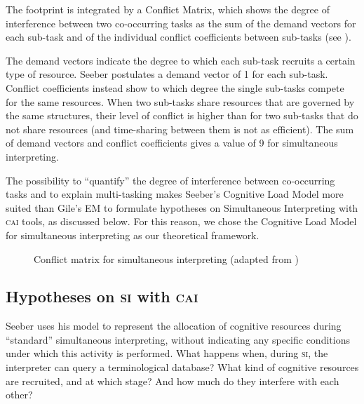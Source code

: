 \documentclass[output=paper]{langsci/langscibook}
\begin{document}
The footprint is integrated by a Conflict Matrix, which shows the degree of interference between two co-occurring tasks as the sum of the demand vectors for each sub-task and of the individual conflict coefficients between sub-tasks (see ). 

The demand vectors indicate the degree to which each sub-task recruits a certain type of resource. Seeber postulates a demand vector of 1 for each sub-task. Conflict coefficients instead show to which degree the single sub-tasks compete for the same resources. When two sub-tasks share resources that are governed by the same structures, their level of conflict is higher than for two sub-tasks that do not share resources (and time-sharing between them is not as efficient). The sum of demand vectors and conflict coefficients gives a value of 9 for simultaneous interpreting.

The possibility to ``quantify'' the degree of interference between co-occurring tasks and to explain multi-tasking makes Seeber’s Cognitive Load Model more suited than Gile’s EM to formulate hypotheses on Simultaneous Interpreting with \textsc{cai} tools, as discussed below. For this reason, we chose the Cognitive Load Model for simultaneous interpreting as our theoretical framework.

\begin{figure}
	\begin{tikzpicture}
	
	\end{tikzpicture}
\caption{Conflict matrix for simultaneous interpreting (adapted from \citealt[1385]{Seeber2007})\label{fig:prandi:3}}
\end{figure}

\subsection{Hypotheses on \textsc{si} with \textsc{cai}}\label{sec:prandi:2.2}
Seeber uses his model to represent the allocation of cognitive resources during ``standard'' simultaneous interpreting, without indicating any specific conditions under which this activity is performed. What happens when, during \textsc{si}, the interpreter can query a terminological database? What kind of cognitive resources are recruited, and at which stage? And how much do they interfere with each other?
\end{document}
